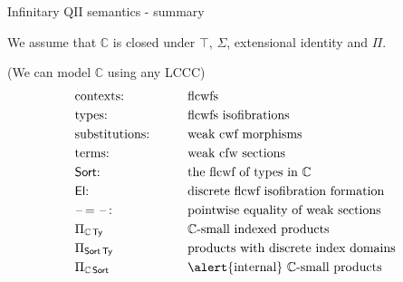 \documentclass[dvipsnames]{beamer}
\newcommand{\mbb}[1]{\mathbb{#1}}
\newcommand{\Ty}{\mathsf{Ty}}
\newcommand{\El}{\mathsf{El}}
\newcommand{\blank}{\mathord{\hspace{1pt}\text{--}\hspace{1pt}}}
\newcommand{\Sort}{\mathsf{Sort}}
\newcommand{\mbbC}{\mbb{C}}
\begin{document}
\begin{frame}{Infinitary QII semantics - summary}

We assume that $\mbbC$ is closed under $\top$, $\Sigma$, extensional identity
and \alert{$\Pi$}.

\vspace{1em}

(We can model $\mbbC$ using any LCCC)
\begin{alignat*}{3}
  & \text{contexts:}                  && \text{flcwfs}\\
  & \text{types:}                     && \text{flcwfs isofibrations}\\
  & \text{substitutions:}\hspace{2em} && \text{weak cwf morphisms}\\
  & \text{terms:}                     && \text{weak cfw sections}\\
  & \text{$\Sort$:}                   && \text{the flcwf of types in $\mbbC$}\\
  & \text{$\El$:}                     && \text{discrete flcwf isofibration formation}\\
  & \blank\!=\blank\!:                && \text{pointwise equality of weak sections}\\
  & \Pi_{\mbbC\,\Ty}                    && \text{$\mbbC$-small indexed products}\\
  & \Pi_{\Sort\,\Ty}                    && \text{products with discrete index domains}\\
  & \Pi_{\mbbC\,\Sort}                  && \text{\alert{internal} $\mbbC$-small products}\\
\end{alignat*}

\end{frame}
\end{document}
